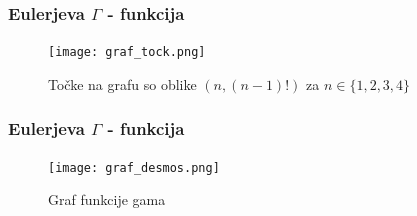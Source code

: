 \documentclass{beamer}
\theoremstyle{plain}
\begin{document}
\begin{frame}
\frametitle{Eulerjeva $\Gamma$ - funkcija}
\begin{figure}
\texttt{[image: graf\_tock.png]}
\caption{Točke na grafu so oblike $(n,(n-1)!)$ za $n \in \{1,2,3,4\}$}
\end{figure}
\end{frame}

\begin{frame}
\frametitle{Eulerjeva $\Gamma$ - funkcija}
\begin{figure}
\texttt{[image: graf\_desmos.png]}
\caption{Graf funkcije gama}
\end{figure}
\end{frame}

\end{document}
